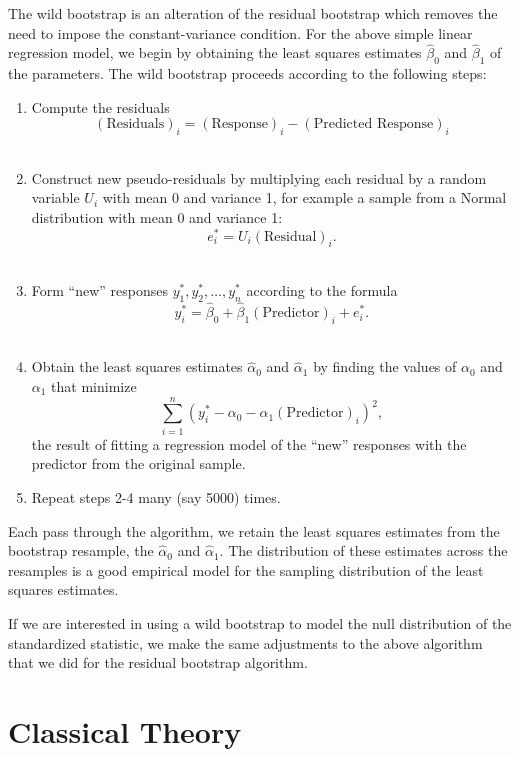 \documentclass[
  letterpaper,
  DIV=11,
  numbers=noendperiod]{scrreprt}
\providecommand{\tightlist}{%
  \setlength{\itemsep}{0pt}\setlength{\parskip}{0pt}}\usepackage{longtable,booktabs,array}
\theoremstyle{plain}
\theoremstyle{definition}
\theoremstyle{definition}
\theoremstyle{remark}
\begin{document}
The wild bootstrap is an alteration of the residual bootstrap which
removes the need to impose the constant-variance condition. For the
above simple linear regression model, we begin by obtaining the least
squares estimates \(\widehat{\beta}_0\) and \(\widehat{\beta}_1\) of the
parameters. The wild bootstrap proceeds according to the following
steps:

\begin{enumerate}
\def\labelenumi{\arabic{enumi}.}
\tightlist
\item
  Compute the residuals
  \[(\text{Residuals})_i = (\text{Response})_i - (\text{Predicted Response})_i\]\\
\item
  Construct new pseudo-residuals by multiplying each residual by a
  random variable \(U_i\) with mean 0 and variance 1, for example a
  sample from a Normal distribution with mean 0 and variance 1:
  \[e_i^* = U_i (\text{Residual})_i.\]\\
\item
  Form ``new'' responses \(y_1^*, y_2^*, \dotsc, y_n^*\) according to
  the formula
  \[y_i^* = \widehat{\beta}_0 + \widehat{\beta}_1 (\text{Predictor})_i + e_i^*.\]\\
\item
  Obtain the least squares estimates \(\widehat{\alpha}_0\) and
  \(\widehat{\alpha}_1\) by finding the values of \(\alpha_0\) and
  \(\alpha_1\) that minimize
  \[\sum_{i=1}^{n} \left(y_i^* - \alpha_0 - \alpha_1 (\text{Predictor})_i\right)^2,\]
  the result of fitting a regression model of the ``new'' responses with
  the predictor from the original sample.\\
\item
  Repeat steps 2-4 many (say 5000) times.
\end{enumerate}

Each pass through the algorithm, we retain the least squares estimates
from the bootstrap resample, the \(\widehat{\alpha}_0\) and
\(\widehat{\alpha}_1\). The distribution of these estimates across the
resamples is a good empirical model for the sampling distribution of the
least squares estimates.

If we are interested in using a wild bootstrap to model the null
distribution of the standardized statistic, we make the same adjustments
to the above algorithm that we did for the residual bootstrap algorithm.

\hypertarget{classical-theory}{%
\section{Classical Theory}\label{classical-theory}}
\end{document}
